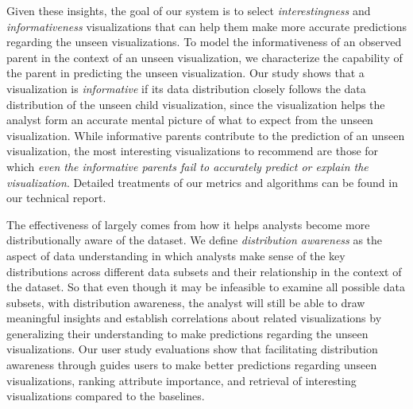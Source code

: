\par Given these insights, the goal of our system is to select \textit{interestingness} and \textit{informativeness} visualizations that can help them make more accurate predictions regarding the unseen visualizations. To model the informativeness of an observed parent in the context of an unseen visualization, we characterize the capability of the parent in predicting the unseen visualization. Our study shows that a visualization is \emph{informative} if its data distribution closely follows the data distribution of the unseen child visualization, since the visualization helps the analyst form an accurate mental picture of what to expect from the unseen visualization. While informative parents contribute to the prediction of an unseen visualization, the most interesting visualizations to recommend are those for which \emph{even the informative parents fail to accurately predict or explain the visualization}. %
Detailed treatments of our metrics and algorithms can be found in our technical report. 
\par The effectiveness of \sbd largely comes from how it helps analysts become more distributionally aware of the dataset. We define \emph{distribution awareness} as the aspect of data understanding in which analysts make sense of the key distributions across different data subsets and their relationship in the context of the dataset. So that even though it may be infeasible to examine all possible data subsets, with distribution awareness, the analyst will still be able to draw meaningful insights and establish correlations about related visualizations by generalizing their understanding to make predictions regarding the unseen visualizations. Our user study evaluations show that facilitating distribution awareness through \sbd guides users to make better predictions regarding unseen visualizations, ranking attribute importance, and retrieval of interesting visualizations compared to the baselines.
